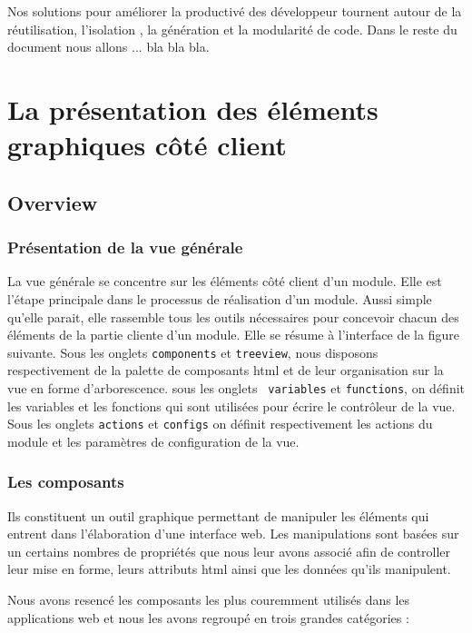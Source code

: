 \documentclass[a4paper,11pt]{report}
\begin{document}
Nos solutions pour améliorer la productivé des développeur tournent
autour de la réutilisation, l'isolation , la génération et la
modularité de code. Dans le reste du document nous allons ... bla bla
bla.


\section{La présentation des éléments graphiques côté client}
\subsection{Overview}

\subsubsection{Présentation de la vue générale}
La vue générale se concentre sur les éléments côté client d'un
module. Elle est l'étape principale dans le processus de réalisation
d'un module. Aussi simple qu'elle parait, elle rassemble tous les
outils nécessaires pour concevoir chacun des éléments de la partie
cliente d'un module. Elle se résume à l'interface de la figure
suivante. Sous les onglets {\tt components} et {\tt treeview}, nous
disposons respectivement de la palette de composants html et de leur
organisation sur la vue en forme d'arborescence. sous les onglets {\tt
variables} et {\tt functions}, on définit les variables et les
fonctions qui sont utilisées pour écrire le contrôleur de la vue. Sous
les onglets {\tt actions} et {\tt configs} on définit respectivement
les actions du module et les paramètres de configuration de la vue. 


\subsubsection{ Les composants} %
Ils constituent un outil graphique permettant de manipuler les
éléments qui entrent dans l'élaboration d'une interface web. Les
manipulations sont basées sur un certains nombres de propriétés que 
nous leur avons associé afin de controller leur mise en forme, leurs
attributs html ainsi que les données qu'ils manipulent.

Nous avons resencé les composants les plus couremment utilisés dans les
applications web et nous les avons regroupé en trois grandes
catégories :
\end{document}
